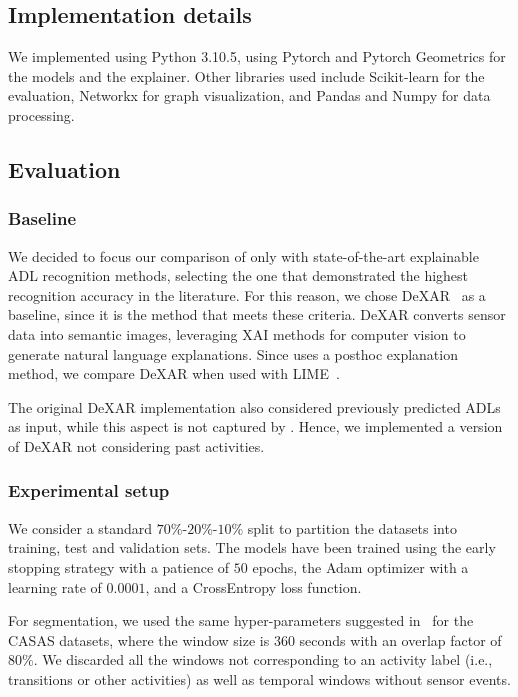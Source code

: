 \subsection{Implementation details}
We implemented \acronym{} using Python 3.10.5, using Pytorch and Pytorch Geometrics for the models and the explainer.
Other libraries used include Scikit-learn for the evaluation, Networkx for graph visualization, and Pandas and Numpy for data processing.

\subsection{Evaluation}

\subsubsection{Baseline}
We decided to focus our comparison of \acronym{} only with state-of-the-art explainable ADL recognition methods, selecting the one that demonstrated the highest recognition accuracy in the literature.
For this reason, we chose DeXAR~\cite{arrotta2022dexar} as a baseline, since it is the method that meets these criteria. DeXAR converts sensor data into semantic images, leveraging XAI methods for computer vision to generate natural language explanations. Since \acronym{} uses a posthoc explanation method, we compare DeXAR when used with LIME~\cite{ribeiro2016should}.

The original DeXAR implementation also considered previously predicted ADLs as input, while this aspect is not captured by \acronym{}. Hence, we implemented a version of DeXAR not considering past activities.



\subsubsection{Experimental setup}

We consider a standard $70\%$-$20\%$-$10\%$ split to partition the datasets into training, test and validation sets.
The models have been trained using the early stopping strategy with a patience of $50$ epochs, the Adam optimizer with a learning rate of $0.0001$, and a CrossEntropy loss function.

For segmentation, we used the same hyper-parameters suggested in~\cite{arrotta2022dexar} for the CASAS datasets, where the window size is $360$ seconds with an overlap factor of $80\%$.
We discarded all the windows not corresponding to an activity label (i.e., transitions or other activities) as well as temporal windows without sensor events.


